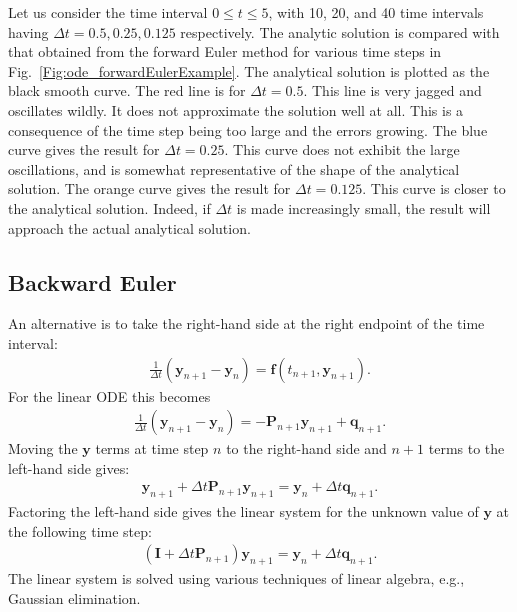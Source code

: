 Let us consider the time interval $0 \le t \le 5$, with 10, 20, and 40 time intervals having $\Delta t = 0.5, 0.25, 0.125$ respectively. The analytic solution is compared with that obtained from the forward Euler method for various time steps in Fig.~\ref{Fig:ode_forwardEulerExample}. The analytical solution is plotted as the black smooth curve. The red line is for $\Delta t = 0.5$. This line is very jagged and oscillates wildly. It does not approximate the solution well at all. This is a consequence of the time step being too large and the errors growing. The blue curve gives the result for $\Delta t = 0.25$. This curve does not exhibit the large oscillations, and is somewhat representative of the shape of the analytical solution. The orange curve gives the result for $\Delta t = 0.125$. This curve is closer to the analytical solution. Indeed, if $\Delta t$ is made increasingly small, the result will approach the actual analytical solution.


\subsection{Backward Euler}

An alternative is to take the right-hand side at the right endpoint of the time interval:
\begin{align}
   \frac{1}{\Delta t}  \left( \mathbf{y}_{n+1} - \mathbf{y}_n \right) = \mathbf{f}( t_{n+1}, \mathbf{y}_{n+1} ).
\end{align}
For the linear ODE this becomes
\begin{align}
   \frac{1}{\Delta t}  \left( \mathbf{y}_{n+1} - \mathbf{y}_n \right) = -\mathbf{P}_{n+1} \mathbf{y}_{n+1} + \mathbf{q}_{n+1} .
\end{align}
Moving the $\mathbf{y}$ terms at time step $n$ to the right-hand side and $n+1$ terms to the left-hand side gives:
\begin{align}
   \mathbf{y}_{n+1} + \Delta t \mathbf{P}_{n+1} \mathbf{y}_{n+1} = \mathbf{y}_n + \Delta t \mathbf{q}_{n+1} .
\end{align}
Factoring the left-hand side gives the linear system for the unknown value of $\mathbf{y}$ at the following time step:
\begin{align}
   \left( \mathbf{I} + \Delta t \mathbf{P}_{n+1} \right) \mathbf{y}_{n+1} = \mathbf{y}_n + \Delta t \mathbf{q}_{n+1} .
\end{align}
The linear system is solved using various techniques of linear algebra, e.g., Gaussian elimination.

